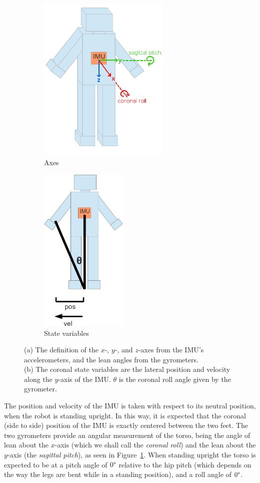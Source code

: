 \begin{figure}[h]
\centering
\begin{subfigure}{0.4\textwidth}
  \centering
  \includegraphics[height=8cm]{img/axes.png}
  \caption{Axes}
  \label{fig:trig}
\end{subfigure}
\begin{subfigure}{0.4\textwidth}
  \centering
  \includegraphics[height=8cm]{img/lean_trig.png}
  \caption{State variables}
  \label{fig:triangle}
\end{subfigure}
\caption{(a) The definition of the $x$-, $y$-, and $z$-axes from the IMU's accelerometers, and the lean angles from the gyrometers.\\(b) The coronal state variables are the lateral position and velocity along the $y$-axis of the IMU. $\theta$ is the coronal roll angle given by the gyrometer.}
\label{fig:total}
\end{figure}

The position and velocity of the IMU is taken with respect to its neutral position, when the robot is standing upright. In this way, it is expected that the coronal (side to side) position of the IMU is exactly centered between the two feet. The two gyrometers provide an angular measurement of the torso, being the angle of lean about the $x$-axis (which we shall call the \textit{coronal roll}) and the lean about the $y$-axis (the \textit{sagittal pitch}), as seen in Figure~\ref{fig:trig}. When standing upright the torso is expected to be at a pitch angle of $0\degree$ relative to the hip pitch (which depends on the way the legs are bent while in a standing position), and a roll angle of $0\degree$.


